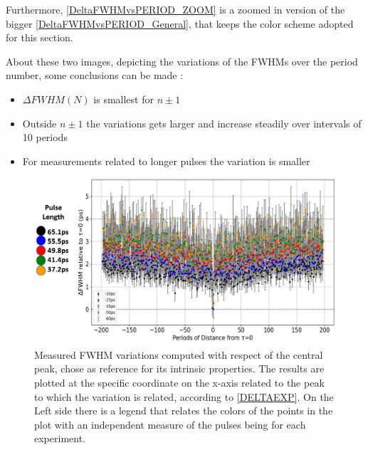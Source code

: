 Furthermore, \autoref{DeltaFWHMvsPERIOD_ZOOM} is a zoomed in version of the bigger \autoref{DeltaFWHMvsPERIOD_General}, that keeps the color scheme adopted for this section.

About these two images, depicting the variations of the FWHMs over the period number, some conclusions can be made :

\begin{itemize}
\item $\Delta FWHM(N)$ is smallest for $n \pm 1$
\item Outside $n \pm 1$ the variations gets larger and increase steadily over intervals of 10 periods
\item For measurements related to longer pulses the variation is smaller	
\end{itemize}



\begin{figure}[hbtp]
\centering
\includegraphics[width=1\textwidth]{DeltaFWHMvsPeriods.jpg}
\caption{Measured FWHM variations computed with respect of the central peak, chose as reference for its intrinsic properties. The results are plotted at the specific coordinate on the x-axis related to the peak to which the variation is related, according to \autoref{DELTAEXP}. On the Left side there is a legend that relates the colors of the points in the plot with an independent measure of the pulses being for each experiment.}
\label{DeltaFWHMvsPERIOD_General}
\end{figure}

